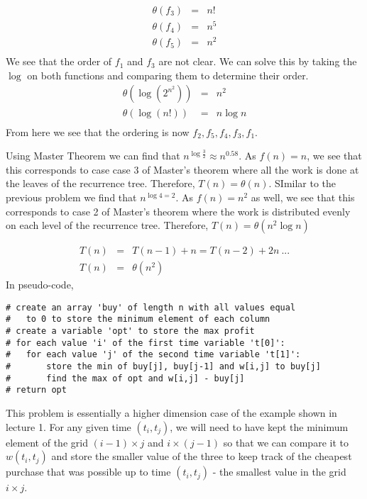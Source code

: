 \documentclass[12pt,twoside]{article}
\begin{document}
\begin{problems}
\begin{problemparts}
\begin{eqnarray*}
\theta(f_3) &=& n!\\
\theta(f_4) &=& n^5\\
\theta(f_5) &=& n^2\\
\end{eqnarray*}
We see that the order of $f_1$ and $f_3$ are not clear. We can solve this by taking the $\log$ on both functions and comparing them to determine their order.
\begin{eqnarray*}
\theta(\log (2^{n^2})) &=& n^2\\
\theta(\log (n!)) &=& n \log n\\
\end{eqnarray*}
From here we see that the ordering is now $f_2, f_5, f_4, f_3, f_1$.
\end{problemparts}

\problem  %
\begin{problemparts}
\problempart
Using Master Theorem we can find that $n^{\log \frac{3}{2}} \approx n^{0.58}$. As $f(n) = n$, we see that this corresponds to case case 3 of Master's theorem where all the work is done at the leaves of the recurrence tree. Therefore, $T(n) = \theta(n)$.
\problempart
SImilar to the previous problem we find that $n^{\log 4 = 2}$. As $f(n) = n^2$ as well, we see that this corresponds to case 2 of Master's theorem where the work is distributed evenly on each level of the recurrence tree. Therefore, $T(n) = \theta(n^2 \log n)$
\problempart
\end{problemparts}
\begin{eqnarray*}
T(n) &=& T(n-1) + n = T(n-2) + 2n\ ...\\
T(n) &=& \theta(n^2)
\end{eqnarray*}
\problem  %
In pseudo-code,
\begin{lstlisting}
# create an array 'buy' of length n with all values equal
#   to 0 to store the minimum element of each column
# create a variable 'opt' to store the max profit
# for each value 'i' of the first time variable 't[0]':
#   for each value 'j' of the second time variable 't[1]':
#       store the min of buy[j], buy[j-1] and w[i,j] to buy[j]
#       find the max of opt and w[i,j] - buy[j]
# return opt
\end{lstlisting}
This problem is essentially a higher dimension case of the example shown in lecture 1. For any given time $(t_i, t_j)$, we will need to have kept the minimum element of the grid $(i-1) \times j$ and $i \times (j-1)$ so that we can compare it to $w(t_i, t_j)$ and store the smaller value of the three to keep track of the cheapest purchase that was possible up to time $(t_i, t_j)$ - the smallest value in the grid $i \times j$.

\end{problems}
\end{document}
